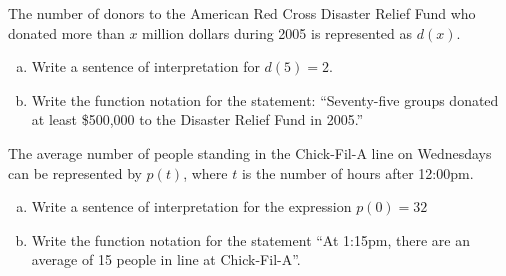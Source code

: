 \documentclass[notes]{subfiles}
\begin{document}
		\begin{ex}
			The number of donors to the American Red Cross Disaster Relief Fund who donated more than $x$ million dollars during 2005 is represented as $d(x)$.
			\begin{enumerate}[(a)]
				\item Write a sentence of interpretation for $d(5) = 2$.
				\item Write the function notation for the statement: ``Seventy-five groups donated at least \$500,000 to the Disaster Relief Fund in 2005.'' 	
			\end{enumerate}
		\end{ex}
		
		\begin{ex}
			The average number of people standing in the Chick-Fil-A line on Wednesdays can be represented by $p(t)$, where $t$ is the number of hours after 12:00pm.
			\begin{enumerate}[(a)]
				\item Write a sentence of interpretation for the expression $p(0) = 32$
					\vs{1}
				\item Write the function notation for the statement ``At 1:15pm, there are an average of 15 people in line at Chick-Fil-A''.
					\vs{.5}
			\end{enumerate}
		\end{ex}
		\clearpage
\end{document}
